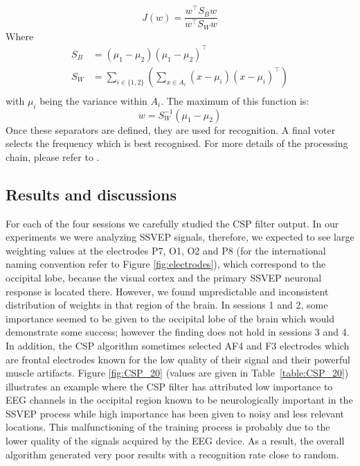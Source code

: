 \documentclass[smallextended]{svjour3}
\begin{document}
\[
J(w) = \frac{w^\top S_Bw}{w^\top S_Ww}
\]
Where 
\begin{align*}
S_B &= (\mu_1-\mu_2)(\mu_1-\mu_2)^\top\\
S_W &= \sum_{i \in \{1, 2\}}   ( \sum_{x\in A_i} (x-\mu_i)(x-\mu_i)^\top )\\
\end{align*}
with $\mu_i$ being the variance within $A_i$. The maximum of this function is:
\[
w = S_W^{-1}(\mu_1-\mu_2)
\]
Once these separators are defined, they are used for recognition. A final voter selects the frequency which is best recognised.
For more details of the processing chain, please refer to \cite{openvibeSSVEP}.

\subsection{Results and discussions}
For each of the four sessions we carefully studied the CSP filter output.
In our experiments we were analyzing SSVEP signals, therefore, we expected to see large weighting values at the electrodes P7, O1, O2 and P8 (for the international naming convention refer to Figure \ref{fig:electrodes}), which correspond to the occipital lobe, because the visual cortex and the primary SSVEP neuronal response is located there. However, we found unpredictable and inconsistent distribution of weights in that region of the brain.
In sessions 1 and 2, some importance seemed to be given to the occipital lobe of the brain which would demonstrate some success; however the finding does not hold in sessions 3 and 4.
In addition, the CSP algorithm sometimes selected AF4 and F3 electrodes which are frontal electrodes known for the low quality of their signal and their powerful muscle artifacts.
Figure \ref{fig:CSP_20} (values are given in Table~\ref{table:CSP_20}) illustrates an example where the CSP filter has attributed low importance to EEG channels in the occipital region known to be neurologically important in the SSVEP process while high importance has been given to noisy and less relevant locations. This malfunctioning of the training process is probably due to the lower quality of the signals acquired by the EEG device. As a result, the overall algorithm generated very poor results with a recognition rate close to random.\\
\\
\end{document}
